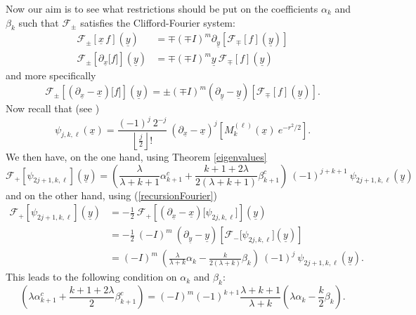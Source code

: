 \documentclass{amsart}
\theoremstyle{remark}
\begin{document}
Now our aim is to see what restrictions should be put on the coefficients $\alpha_k$ and $\beta_k$ such that ${\mathcal{F}}_{\pm}$ satisfies the Clifford-Fourier system:
\begin{align*}
{\mathcal{F}}_{\pm} \left\lbrack {\underline{x}} \, f \right\rbrack({\underline{y}}) & = \mp (\mp I)^{m} {\partial_{\underline{y}}} \left\lbrack {\mathcal{F}}_{\mp} \left\lbrack f \right\rbrack ({\underline{y}}) \right\rbrack \\
{\mathcal{F}}_{\pm} \left\lbrack {\partial_{\underline{x}}} \lbrack f \rbrack  \right\rbrack ({\underline{y}}) & = \mp (\mp I)^{m}  {\underline{y}} \ {\mathcal{F}}_{\mp} \left\lbrack f \right\rbrack ({\underline{y}})
\end{align*}
and more specifically
\begin{equation}\label{recursionFourier}
{\mathcal{F}}_{\pm} \left\lbrack({\partial_{\underline{x}}}-{\underline{x}}) \lbrack f \rbrack \right\rbrack ({\underline{y}}) = \pm (\mp I)^{m}  ( {\partial_{\underline{y}}} - {\underline{y}}) \left\lbrack {\mathcal{F}}_{\mp} \left\lbrack f \right\rbrack ({\underline{y}}) \right\rbrack.
\end{equation}
Now recall that (see \cite{MR926831})
\begin{displaymath}
\psi_{j,k,\ell}({\underline{x}}) = \frac{(-1)^j \ 2^{-j}}{\left\lfloor \frac{j}{2} \right\rfloor!} \ ({\partial_{\underline{x}}}-{\underline{x}})^{j} \left\lbrack M_{k}^{(\ell)}({\underline{x}}) \  e^{-r^{2}/2} \right\rbrack.
\end{displaymath}
We then have, on the one hand, using Theorem \ref{eigenvalues}
\[
{\mathcal{F}}_{+}\left\lbrack \psi_{2j+1,k,\ell}\right\rbrack ({\underline{y}}) = \left(\frac{{\lambda}}{{{\lambda}}+k+1} \alpha_{k+1}^c + \frac{k+1+2{{\lambda}}}{2({{\lambda}}+k+1)} \beta_{k+1}^c \right) \ (-1)^{j+k+1} \ \psi_{2j+1,k,\ell}({\underline{y}})
\]
and on the other hand, using (\ref{recursionFourier})
\begin{align*}
{\mathcal{F}}_{+} \left\lbrack \psi_{2j+1,k,\ell}\right\rbrack ({\underline{y}}) &= - \frac{1}{2} \ {\mathcal{F}}_{+}\left\lbrack ({\partial_{\underline{x}}}-{\underline{x}}) \lbrack \psi_{2j,k,\ell}\rbrack \right\rbrack ({\underline{y}})\\
&=  -\frac{1}{2} \ (- I)^{m}  \ ( {\partial_{\underline{y}}} - {\underline{y}})  \left\lbrack {\mathcal{F}}_{-} \lbrack \psi_{2j,k,\ell} \rbrack ({\underline{y}}) \right\rbrack\\
&=  (- I)^{m}  \ \left(\frac{{\lambda}}{{{\lambda}}+k} \alpha_{k} - \frac{k}{2({{\lambda}}+k)} \beta_{k} \right) \ (-1)^{j} \ \psi_{2j+1,k,\ell}({\underline{y}}).
\end{align*}
This leads to the following condition on $\alpha_{k}$ and $\beta_{k}$:
\[
 \left({{\lambda}} \alpha_{k+1}^c + \frac{k+1+2{{\lambda}}}{2} \beta_{k+1}^c \right) =  (- I)^{m}(-1)^{k+1} \frac{{{\lambda}}+k+1}{{{\lambda}}+k}  \left({{\lambda}} \alpha_{k} - \frac{k}{2} \beta_{k} \right).
\]
\end{document}
